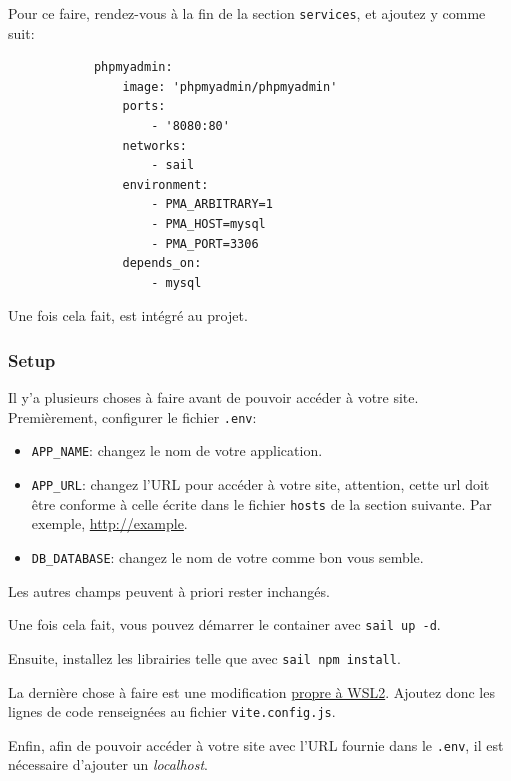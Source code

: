         Pour ce faire, rendez-vous à la fin de la section \verb|services|, et ajoutez y \phpmyadmin{} comme suit:

        \begin{lstlisting}
            phpmyadmin:
                image: 'phpmyadmin/phpmyadmin'
                ports:
                    - '8080:80'
                networks:
                    - sail
                environment:
                    - PMA_ARBITRARY=1
                    - PMA_HOST=mysql
                    - PMA_PORT=3306
                depends_on:
                    - mysql
        \end{lstlisting}

        Une fois cela fait, \phpmyadmin{} est intégré au projet.

        \subsubsection[Setup]{Setup}
        Il y'a plusieurs choses à faire avant de pouvoir accéder à votre site. Premièrement, configurer le fichier \verb|.env|:

        \begin{itemize}
            \item \verb|APP_NAME|: changez le nom de votre application.
            \item \verb|APP_URL|: changez l'URL pour accéder à votre site, attention, cette url doit être conforme à celle écrite dans le fichier \verb|hosts| de la section suivante. Par exemple, \url{http://example}.
            \item \verb|DB_DATABASE|: changez le nom de votre \db{} comme bon vous semble.
        \end{itemize}
        Les autres champs peuvent à priori rester inchangés.

        Une fois cela fait, vous pouvez démarrer le container avec \verb|sail up -d|.

        Ensuite, installez les librairies \js{} telle que \vite{} avec \verb|sail npm install|.

        La dernière chose à faire est une modification \href{https://laravel.com/docs/10.x/vite#configuring-hmr-in-sail-on-wsl2}{propre à WSL2}. Ajoutez donc les lignes de code renseignées au fichier \verb|vite.config.js|.

        Enfin, afin de pouvoir accéder à votre site avec l'URL fournie dans le \verb|.env|, il est nécessaire d'ajouter un \textit{localhost}.

